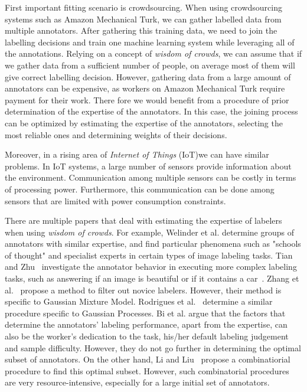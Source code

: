 \documentclass{llncs}
\begin{document}
First important fitting scenario is crowdsourcing. When using crowdsourcing systems such as Amazon Mechanical Turk, we can gather labelled data from multiple annotators. After gathering this training data, we need to join the labelling decisions and train one machine learning system while leveraging all of the annotations. Relying on a concept of \textit{wisdom of crowds}, we can assume that if we gather data from a sufficient number of people, on average most of them will give correct labelling decision. However, gathering data from a large amount of annotators can be expensive, as workers on Amazon Mechanical Turk require payment for their work. There fore we would benefit from a procedure of prior determination of the expertise of the annotators. In this case, the joining process can be optimized by estimating the expertise of the annotators, selecting the most reliable ones and determining weights of their decisions. 

Moreover, in a rising area of \textit{Internet of Things} (IoT)we can have similar problems. In IoT systems, a large number of sensors provide information about the environment. Communication among multiple sensors can be costly in terms of processing power. Furthermore, this communication can be done among sensors that are limited with power consumption constraints.

There are multiple papers that deal with estimating the expertise of labelers when using \textit{wisdom of crowds}. For example, Welinder et al. \cite{} determine groups of annotators with similar expertise, and find particular phenomena such as "schools of thought" and specialist experts in certain types of image labeling tasks. Tian and Zhu~\cite{} investigate the annotator behavior in executing more complex labeling tasks, such as answering if an image is beautiful or if it contains a car~\cite{}. Zhang et al.~\cite{} propose a method to filter out novice labelers. However, their method is specific to Gaussian Mixture Model. Rodrigues et al.~\cite{} determine a similar procedure specific to Gaussian Processes. Bi et al. argue that the factors that determine the annotators' labeling performance, apart from the expertise, can also be the worker's dedication to the task, his/her default labeling judgement and sample difficulty. However, they do not go further in determining the optimal subset of annotators. On the other hand, Li and Liu~\cite{} propose a combinatiorial procedure to find this optimal subset. However, such combinatorial procedures are very resource-intensive, especially for a large initial set of annotators.
\end{document}
